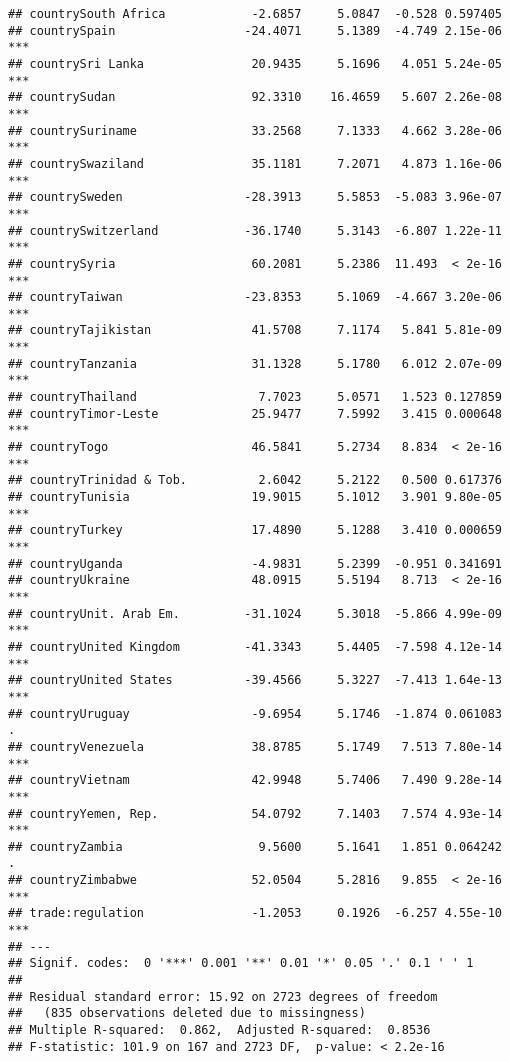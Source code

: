 \documentclass[
  11pt,
]{article}
\begin{document}
\begin{verbatim}
## countrySouth Africa            -2.6857     5.0847  -0.528 0.597405    
## countrySpain                  -24.4071     5.1389  -4.749 2.15e-06 ***
## countrySri Lanka               20.9435     5.1696   4.051 5.24e-05 ***
## countrySudan                   92.3310    16.4659   5.607 2.26e-08 ***
## countrySuriname                33.2568     7.1333   4.662 3.28e-06 ***
## countrySwaziland               35.1181     7.2071   4.873 1.16e-06 ***
## countrySweden                 -28.3913     5.5853  -5.083 3.96e-07 ***
## countrySwitzerland            -36.1740     5.3143  -6.807 1.22e-11 ***
## countrySyria                   60.2081     5.2386  11.493  < 2e-16 ***
## countryTaiwan                 -23.8353     5.1069  -4.667 3.20e-06 ***
## countryTajikistan              41.5708     7.1174   5.841 5.81e-09 ***
## countryTanzania                31.1328     5.1780   6.012 2.07e-09 ***
## countryThailand                 7.7023     5.0571   1.523 0.127859    
## countryTimor-Leste             25.9477     7.5992   3.415 0.000648 ***
## countryTogo                    46.5841     5.2734   8.834  < 2e-16 ***
## countryTrinidad & Tob.          2.6042     5.2122   0.500 0.617376    
## countryTunisia                 19.9015     5.1012   3.901 9.80e-05 ***
## countryTurkey                  17.4890     5.1288   3.410 0.000659 ***
## countryUganda                  -4.9831     5.2399  -0.951 0.341691    
## countryUkraine                 48.0915     5.5194   8.713  < 2e-16 ***
## countryUnit. Arab Em.         -31.1024     5.3018  -5.866 4.99e-09 ***
## countryUnited Kingdom         -41.3343     5.4405  -7.598 4.12e-14 ***
## countryUnited States          -39.4566     5.3227  -7.413 1.64e-13 ***
## countryUruguay                 -9.6954     5.1746  -1.874 0.061083 .  
## countryVenezuela               38.8785     5.1749   7.513 7.80e-14 ***
## countryVietnam                 42.9948     5.7406   7.490 9.28e-14 ***
## countryYemen, Rep.             54.0792     7.1403   7.574 4.93e-14 ***
## countryZambia                   9.5600     5.1641   1.851 0.064242 .  
## countryZimbabwe                52.0504     5.2816   9.855  < 2e-16 ***
## trade:regulation               -1.2053     0.1926  -6.257 4.55e-10 ***
## ---
## Signif. codes:  0 '***' 0.001 '**' 0.01 '*' 0.05 '.' 0.1 ' ' 1
## 
## Residual standard error: 15.92 on 2723 degrees of freedom
##   (835 observations deleted due to missingness)
## Multiple R-squared:  0.862,  Adjusted R-squared:  0.8536 
## F-statistic: 101.9 on 167 and 2723 DF,  p-value: < 2.2e-16
\end{verbatim}
\end{document}
